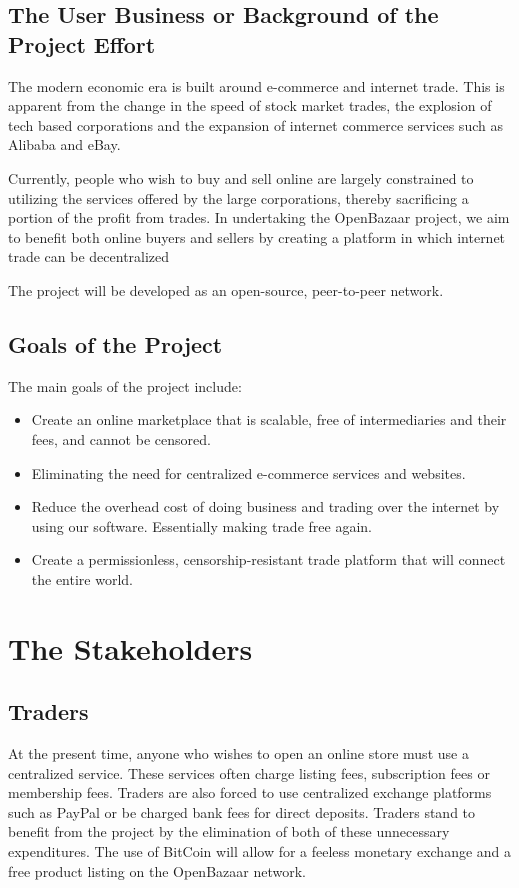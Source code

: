 \documentclass{article}
\begin{document}
\subsection{The User Business or Background of the Project Effort}

The modern economic era is built around e-commerce and internet trade. This is apparent from the change in the speed of stock market trades, the explosion of tech based corporations and the expansion of internet commerce services such as Alibaba and eBay.

Currently, people who wish to buy and sell online are largely constrained to utilizing the services offered by the large corporations, thereby sacrificing a portion of the profit from trades. In undertaking the OpenBazaar project, we aim to benefit both online buyers and sellers by creating a platform in which internet trade can be decentralized


The project will be developed as an open-source, peer-to-peer network. 


\subsection{Goals of the Project}
The main goals of the project include:

\begin{itemize}

\item
Create an online marketplace that is scalable, free of intermediaries and their fees, and cannot be censored.

\item
Eliminating the need for centralized e-commerce services and websites.

\item
Reduce the overhead cost of doing business and trading over the internet by using our software. Essentially making trade free again.

\item
Create a permissionless, censorship-resistant trade platform that will connect the entire world.
\end{itemize}

\section{The Stakeholders}

\subsection{Traders}
At the present time, anyone who wishes to open an online store must use a centralized service. These services often charge listing fees, subscription fees or membership fees. Traders are also forced to use centralized exchange platforms such as PayPal or be charged bank fees for direct deposits. Traders stand to benefit from the project by the elimination of both of these unnecessary expenditures. The use of BitCoin will allow for a feeless monetary exchange and a free product listing on the OpenBazaar network.
\end{document}
